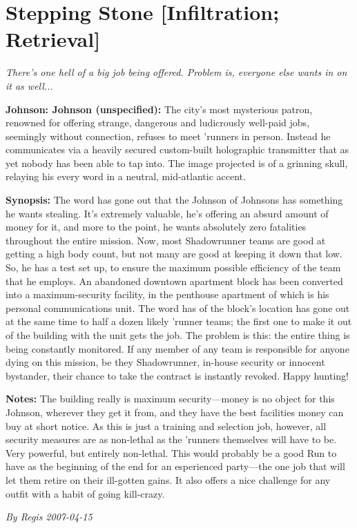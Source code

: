 \documentclass[letterpaper,twocolumn,10.5pt]{article}
\newenvironment{scenario}[6]
	{
		\section{#1 {\small[#2]}}
		\textit{#3}
		\def\TMPSCENARIO{#4 #5}
	}
	{\small\textit{By \TMPSCENARIO}}
\newcommand{\johnson}[2]{\textbf{Johnson: #1 (#2):}}
\newcommand{\synopsis}{\textbf{Synopsis: }}
\newcommand{\notes}{\textbf{Notes: }}
\begin{document}
\begin{scenario}{Stepping Stone}
	{Infiltration; Retrieval}
	{ There's one hell of a big job being offered. Problem is, everyone else wants in on it as well...}
	{Regis}
	{2007-04-15}
	{https://forum.rpg.net/showthread.php?321504-Shadowrun-4th-101-Instant-Scenarios\&p=7172198#post7172198}

\johnson{Johnson}{unspecified} The city's most mysterious patron, renowned for offering strange, dangerous and ludicrously well-paid jobs, seemingly without connection, refuses to meet 'runners in person. Instead he communicates via a heavily secured custom-built holographic transmitter that as yet nobody has been able to tap into. The image projected is of a grinning skull, relaying his every word in a neutral, mid-atlantic accent.

\synopsis The word has gone out that the Johnson of Johnsons has something he wants stealing. It's extremely valuable, he's offering an absurd amount of money for it, and more to the point, he wants absolutely zero fatalities throughout the entire mission. Now, most Shadowrunner teams are good at getting a high body count, but not many are good at keeping it down that low. So, he has a test set up, to ensure the maximum possible efficiency of the team that he employs. An abandoned downtown apartment block has been converted into a maximum-security facility, in the penthouse apartment of which is his personal communications unit. The word has of the block's location has gone out at the same time to half a dozen likely 'runner teams; the first one to make it out of the building with the unit gets the job. The problem is this: the entire thing is being constantly monitored. If any member of any team is responsible for anyone dying on this mission, be they Shadowrunner, in-house security or innocent bystander, their chance to take the contract is instantly revoked. Happy hunting!

\notes The building really is maximum security---money is no object for this Johnson, wherever they get it from, and they have the best facilities money can buy at short notice. As this is just a training and selection job, however, all security measures are as non-lethal as the 'runners themselves will have to be. Very powerful, but entirely non-lethal. This would probably be a good Run to have as the beginning of the end for an esperienced party---the one job that will let them retire on their ill-gotten gains. It also offers a nice challenge for any outfit with a habit of going kill-crazy. 

\end{scenario}
\end{document}
